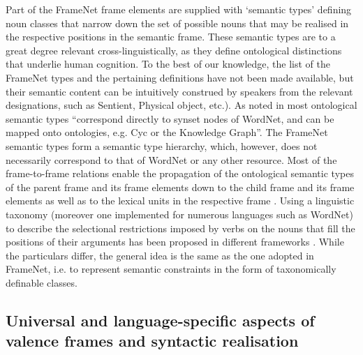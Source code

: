 \documentclass[output=paper,colorlinks,citecolor=brown]{langscibook}
\begin{document}
Part of the FrameNet frame elements are supplied with `semantic types' %
defining noun classes that narrow down the set of possible nouns that may be realised in the respective positions in the semantic frame. These semantic types are to a great degree relevant cross-linguistically, as they define ontological distinctions that underlie human cognition. To the best of our knowledge,  the list of the FrameNet types and the pertaining definitions have not been made available, but their semantic content can be intuitively construed by speakers from the relevant designations, such as Sentient, Physical object, etc.). As noted in \citet[86]{Ruppenhofer2016} most ontological semantic types ``correspond directly to synset nodes of WordNet, and can be mapped onto ontologies, e.g. Cyc or the Knowledge Graph''. The FrameNet semantic types form a semantic type hierarchy, which, however, does not necessarily correspond to that of WordNet or any other resource. Most of the frame-to-frame relations enable the propagation of the ontological semantic types of the parent frame and its frame elements down to the child frame and its frame elements \citep[99]{Ruppenhofer2016} as well as to the lexical units in the respective frame \citep[86]{Ruppenhofer2016}.
Using a linguistic taxonomy (moreover one implemented for numerous languages such as WordNet) to describe the selectional restrictions imposed by verbs on the nouns that fill the positions of their arguments has been proposed in different frameworks \citep{agirre-martinez2002,Koeva:2010}. While the particulars differ, the general idea is the same as the one adopted in FrameNet, i.e. to represent semantic constraints in the form of taxonomically definable classes.

\subsection{Universal and language-specific aspects of valence frames and syntactic realisation}
\end{document}
